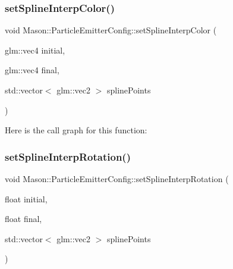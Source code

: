 \hypertarget{struct_mason_1_1_particle_emitter_config_aaf515319a62060a75edbb1e7b6403ff2}{}\label{struct_mason_1_1_particle_emitter_config_aaf515319a62060a75edbb1e7b6403ff2} 
\subsubsection{\texorpdfstring{set\+Spline\+Interp\+Color()}{setSplineInterpColor()}}
{\footnotesize\ttfamily void Mason\+::\+Particle\+Emitter\+Config\+::set\+Spline\+Interp\+Color (\begin{DoxyParamCaption}\item[{glm\+::vec4}]{initial,  }\item[{glm\+::vec4}]{final,  }\item[{std\+::vector$<$ glm\+::vec2 $>$}]{spline\+Points }\end{DoxyParamCaption})\hspace{0.3cm}{\ttfamily [inline]}}

Here is the call graph for this function\+:
\hypertarget{struct_mason_1_1_particle_emitter_config_abcaf3368ccf9b524538a3cf3fadb15d2}{}\label{struct_mason_1_1_particle_emitter_config_abcaf3368ccf9b524538a3cf3fadb15d2} 
\subsubsection{\texorpdfstring{set\+Spline\+Interp\+Rotation()}{setSplineInterpRotation()}}
{\footnotesize\ttfamily void Mason\+::\+Particle\+Emitter\+Config\+::set\+Spline\+Interp\+Rotation (\begin{DoxyParamCaption}\item[{float}]{initial,  }\item[{float}]{final,  }\item[{std\+::vector$<$ glm\+::vec2 $>$}]{spline\+Points }\end{DoxyParamCaption})\hspace{0.3cm}{\ttfamily [inline]}}

